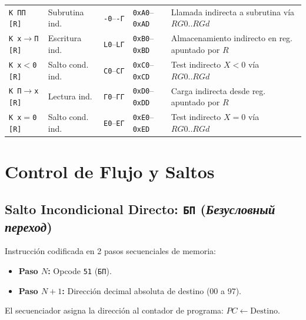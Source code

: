 \documentclass[11pt,a4paper]{article}
\begin{document}
{\begin{longtable}{p{2.2cm}p{3.0cm}>{\centering\arraybackslash}p{1.0cm}>{\centering\arraybackslash}p{1.2cm}p{7.3cm}}
\texttt{K ПП [R]} & Subrutina ind. & \texttt{-0}--\texttt{-Г} & \texttt{0xA0}--\texttt{0xAD} & Llamada indirecta a subrutina vía $RG0..RGd$ \\
\texttt{K x$\to$П [R]} & Escritura ind. & \texttt{L0}--\texttt{LГ} & \texttt{0xB0}--\texttt{0xBD} & Almacenamiento indirecto en reg. apuntado por $R$ \\
\texttt{K x$<$0 [R]} & Salto cond. ind. & \texttt{C0}--\texttt{CГ} & \texttt{0xC0}--\texttt{0xCD} & Test indirecto $X < 0$ vía $RG0..RGd$ \\
\texttt{K П$\to$x [R]} & Lectura ind. & \texttt{Г0}--\texttt{ГГ} & \texttt{0xD0}--\texttt{0xDD} & Carga indirecta desde reg. apuntado por $R$ \\
\texttt{K x$=$0 [R]} & Salto cond. ind. & \texttt{E0}--\texttt{EГ} & \texttt{0xE0}--\texttt{0xED} & Test indirecto $X = 0$ vía $RG0..RGd$ \\
\bottomrule
\end{longtable}
}

\newpage

\section{Control de Flujo y Saltos}

\subsection{Salto Incondicional Directo: \texttt{БП} (\textit{Безусловный переход})}
Instrucción codificada en 2 pasos secuenciales de memoria:
\begin{itemize}
    \item \textbf{Paso $N$:} Opcode \texttt{51} (\texttt{БП}).
    \item \textbf{Paso $N+1$:} Dirección decimal absoluta de destino ($00$ a $97$).
\end{itemize}
El secuenciador asigna la dirección al contador de programa: $PC \leftarrow \text{Destino}$.
\end{document}
